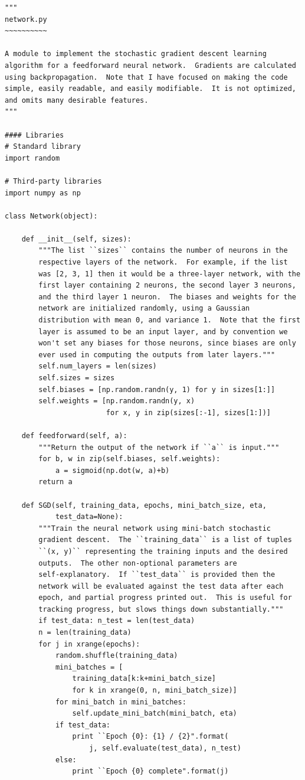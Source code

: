 \begin{verbatim}
"""
network.py
~~~~~~~~~~

A module to implement the stochastic gradient descent learning
algorithm for a feedforward neural network.  Gradients are calculated
using backpropagation.  Note that I have focused on making the code
simple, easily readable, and easily modifiable.  It is not optimized,
and omits many desirable features.
"""

#### Libraries
# Standard library
import random

# Third-party libraries
import numpy as np

class Network(object):

    def __init__(self, sizes):
        """The list ``sizes`` contains the number of neurons in the
        respective layers of the network.  For example, if the list
        was [2, 3, 1] then it would be a three-layer network, with the
        first layer containing 2 neurons, the second layer 3 neurons,
        and the third layer 1 neuron.  The biases and weights for the
        network are initialized randomly, using a Gaussian
        distribution with mean 0, and variance 1.  Note that the first
        layer is assumed to be an input layer, and by convention we
        won't set any biases for those neurons, since biases are only
        ever used in computing the outputs from later layers."""
        self.num_layers = len(sizes)
        self.sizes = sizes
        self.biases = [np.random.randn(y, 1) for y in sizes[1:]]
        self.weights = [np.random.randn(y, x)
                        for x, y in zip(sizes[:-1], sizes[1:])]

    def feedforward(self, a):
        """Return the output of the network if ``a`` is input."""
        for b, w in zip(self.biases, self.weights):
            a = sigmoid(np.dot(w, a)+b)
        return a

    def SGD(self, training_data, epochs, mini_batch_size, eta,
            test_data=None):
        """Train the neural network using mini-batch stochastic
        gradient descent.  The ``training_data`` is a list of tuples
        ``(x, y)`` representing the training inputs and the desired
        outputs.  The other non-optional parameters are
        self-explanatory.  If ``test_data`` is provided then the
        network will be evaluated against the test data after each
        epoch, and partial progress printed out.  This is useful for
        tracking progress, but slows things down substantially."""
        if test_data: n_test = len(test_data)
        n = len(training_data)
        for j in xrange(epochs):
            random.shuffle(training_data)
            mini_batches = [
                training_data[k:k+mini_batch_size]
                for k in xrange(0, n, mini_batch_size)]
            for mini_batch in mini_batches:
                self.update_mini_batch(mini_batch, eta)
            if test_data:
                print ``Epoch {0}: {1} / {2}".format(
                    j, self.evaluate(test_data), n_test)
            else:
                print ``Epoch {0} complete".format(j)


\end{verbatim}
